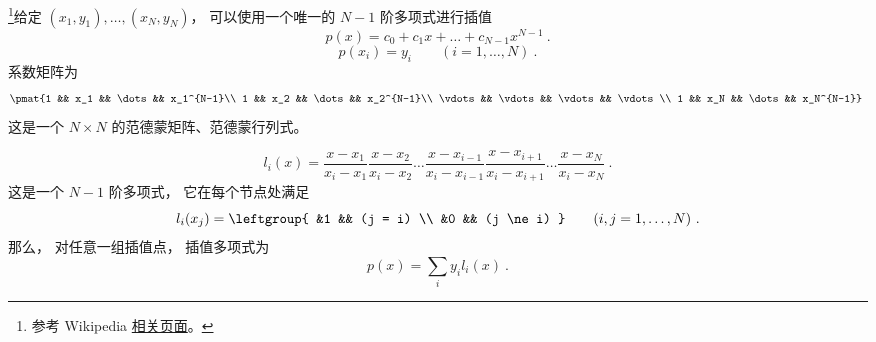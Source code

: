

\footnote{参考 Wikipedia \href{https://en.wikipedia.org/wiki/Lagrange_polynomial}{相关页面}。}给定 $(x_1, y_1), \dots, (x_N, y_N)$， 可以使用一个唯一的 $N-1$ 阶多项式进行插值
\begin{equation}
p(x) = c_0 + c_1x + \dots + c_{N-1}x^{N-1}~.
\end{equation}
\begin{equation}
p(x_i) = y_i \qquad (i=1,\dots,N)~.
\end{equation}
系数矩阵为
\begin{equation}
\pmat{1 && x_1 && \dots && x_1^{N-1}\\
1 && x_2 && \dots && x_2^{N-1}\\
\vdots && \vdots && \vdots && \vdots \\
1 && x_N && \dots && x_N^{N-1}}~
\end{equation}
这是一个 $N\times N$ 的范德蒙矩阵、范德蒙行列式。


\begin{equation}
l_i(x) = \frac{x-x_1}{x_i-x_1} \frac{x-x_2}{x_i-x_2}  \dots \frac{x-x_{i-1}}{x_i-x_{i-1}}\frac{x-x_{i+1}}{x_i-x_{i+1}} \dots \frac{x-x_N}{x_i-x_N}~.
\end{equation}
这是一个 $N-1$ 阶多项式， 它在每个节点处满足
\begin{equation}
l_i(x_j) = \leftgroup{
&1 && (j = i) \\
&0 && (j \ne i)
} \qquad (i,j=1,\dots,N)~.
\end{equation}
那么， 对任意一组插值点， 插值多项式为
\begin{equation}
p(x) = \sum_i y_i l_i(x)~.
\end{equation}
